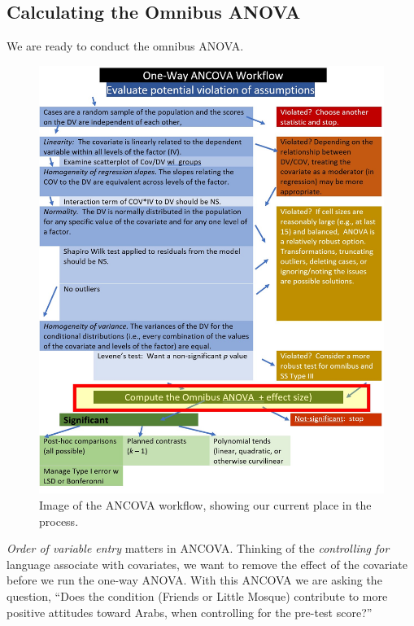 \documentclass[
  11pt,
]{book}
\begin{document}
\hypertarget{calculating-the-omnibus-anova}{%
\subsection{Calculating the Omnibus ANOVA}\label{calculating-the-omnibus-anova}}

We are ready to conduct the omnibus ANOVA.

\begin{figure}
\centering
\includegraphics{images/ANCOVA/wf_ANCOVA_omnibus.jpg}
\caption{Image of the ANCOVA workflow, showing our current place in the process.}
\end{figure}

\emph{Order of variable entry} matters in ANCOVA. Thinking of the \emph{controlling for} language associate with covariates, we want to remove the effect of the covariate before we run the one-way ANOVA. With this ANCOVA we are asking the question, ``Does the condition (Friends or Little Mosque) contribute to more positive attitudes toward Arabs, when controlling for the pre-test score?''
\end{document}

